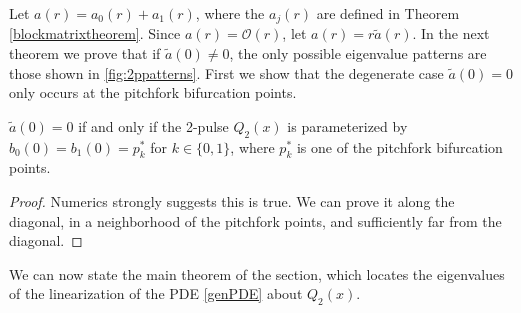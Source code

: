 \documentclass[thesis.tex]{subfiles}
\begin{document}
Let $a(r) = a_0(r) + a_1(r)$, where the $a_j(r)$ are defined in Theorem \ref{blockmatrixtheorem}. Since $a(r) = \mathcal{O}(r)$, let $a(r) = r \tilde{a}(r)$. In the next theorem we prove that if $\tilde{a}(0) \neq 0$, the only possible eigenvalue patterns are those shown in \cref{fig:2ppatterns}. First we show that the degenerate case $\tilde{a}(0) = 0$ only occurs at the pitchfork bifurcation points.

\begin{lemma}
$\tilde{a}(0) = 0$ if and only if the 2-pulse $Q_2(x)$ is parameterized by $b_0(0) = b_1(0) = p_k^*$ for $k \in \{0, 1\}$, where $p_k^*$ is one of the pitchfork bifurcation points.
\begin{proof}
Numerics strongly suggests this is true. We can prove it along the diagonal, in a neighborhood of the pitchfork points, and sufficiently far from the diagonal.
\end{proof}
\end{lemma}

We can now state the main theorem of the section, which locates the eigenvalues of the linearization of the PDE \cref{genPDE} about $Q_2(x)$.
\end{document}
